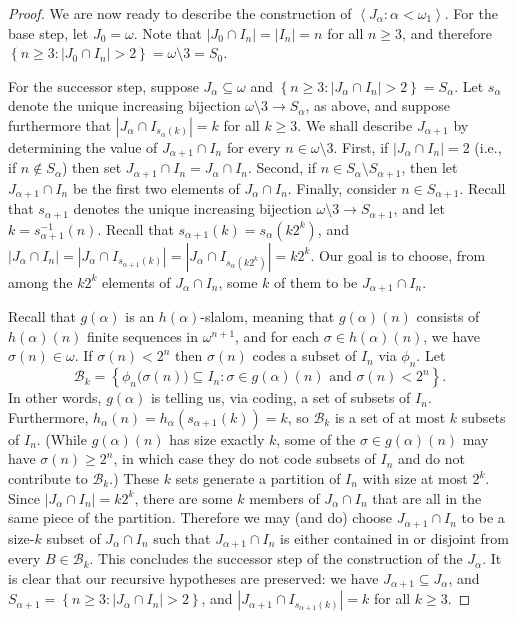 \documentclass[11pt,leqno]{amsart}
\theoremstyle{definition}
\theoremstyle{remark}
\newcommand{\B}{\mathcal{B}}
\newcommand{\explicitSet}[1]{\left\lbrace #1 \right\rbrace}
\newcommand{\brackets}[1]{\left\langle #1 \right\rangle}
\newcommand{\set}[2]{\explicitSet{#1 \colon #2}}
\newcommand{\seq}[2]{\brackets{#1 \colon #2}}
\newcommand{\<}{\langle}
\renewcommand{\>}{\rangle}
\renewcommand{\a}{\alpha}
\newcommand{\s}{\sigma}
\newcommand{\w}{\omega}
\newcommand{\0}{\emptyset}
\newcommand{\sub}{\subseteq}
\newcommand{\1}{1\hspace{-1.75mm}1}
\begin{document}
\begin{proof}
We are now ready to describe the construction of $\seq{J_\a}{\a < \w_1}$. 
For the base step, let $J_0 = \w$. Note that $|J_0 \cap I_n| = |I_n| = n$ for all $n \geq 3$, and therefore $\set{n \geq 3}{|J_0 \cap I_n| > 2} = \w \setminus 3 = S_0$. 

For the successor step, suppose $J_\a \sub \w$ and $\set{n \geq 3}{|J_\a \cap I_n| > 2} = S_\a$. Let $s_\a$ denote the unique increasing bijection $\w \setminus 3 \to S_\a$, as above, and suppose furthermore that $|J_\a \cap I_{s_\a(k)}| = k$ for all $k \geq 3$. 
We shall describe $J_{\a+1}$ by determining the value of $J_{\a+1} \cap I_n$ for every $n \in \w \setminus 3$. 
First, if $|J_\a \cap I_n| = 2$ (i.e., if $n \notin S_\a$) then set $J_{\a+1} \cap I_n = J_\a \cap I_n$. 
Second, if $n \in S_\a \setminus S_{\a+1}$, then let $J_{\a+1} \cap I_n$ be the first two elements of $J_\a \cap I_n$. 
Finally, consider $n \in S_{\a+1}$. 
Recall that $s_{\a+1}$ denotes the unique increasing bijection $\w \setminus 3 \to S_{\a+1}$, and let $k = s_{\a+1}^{-1}(n)$. 
Recall that  $s_{\a+1}(k) = s_\a(k2^k)$, and $|J_\a \cap I_n| = |J_\a \cap I_{s_{\a+1}(k)}| = |J_\a \cap I_{s_\a(k2^k)}| = k2^k$. Our goal is to choose, from among the $k2^k$ elements of $J_\a \cap I_n$, some $k$ of them to be $J_{\a+1} \cap I_n$. 

Recall that $g(\a)$ is an $h(\a)$-slalom, meaning that $g(\a)(n)$ consists of $h(\a)(n)$ finite sequences in $\w^{n+1}$, and for each $\s \in h(\a)(n)$, we have $\s(n) \in \w$. If $\s(n) < 2^n$ then $\s(n)$ codes a subset of $I_n$ via $\phi_n$. 
Let 
$$\B_k = \set{\phi_n\big(\s(n)\big) \sub I_n}{\s \in g(\a)(n) \text{ and }\s(n) < 2^n}.$$ 
In other words, $g(\a)$ is telling us, via coding, a set of subsets of $I_n$. 
Furthermore, $h_{\a}(n) = h_{\a}(s_{\a+1}(k)) = k$, so 
$\B_k$ is a set of at most $k$ subsets of $I_n$. 
(While $g(\a)(n)$ has size exactly $k$, some of the $\s \in g(\a)(n)$ may have $\s(n) \geq 2^n$, in which case they do not code subsets of $I_n$ and do not contribute to $\B_k$.) 
These $k$ sets generate a partition of $I_n$ with size at most $2^k$. 
Since $|J_\a \cap I_n| = k2^k$, there are some $k$ members of $J_\a \cap I_n$ that are all in the same piece of the partition. 
Therefore we may (and do) choose $J_{\a+1} \cap I_n$ to be a size-$k$ subset of $J_\a \cap I_n$ such that $J_{\a+1} \cap I_n$ is either contained in or disjoint from every $B \in \B_k$. 
This concludes the successor step of the construction of the $J_\a$. 
It is clear that our recursive hypotheses are preserved: we have $J_{\a+1} \sub J_\a$, and $S_{\a+1} = \set{n \geq 3}{|J_\a \cap I_n| > 2}$, and $|J_{\a+1} \cap I_{s_{\a+1}(k)}| = k$ for all $k \geq 3$. 


\end{proof}
\end{document}
